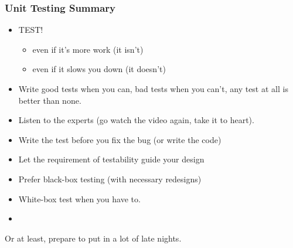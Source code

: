 \begin{frame}[fragile,t]
\frametitle{Unit Testing Summary}

\begin{itemize}
\item TEST!
\begin{itemize}
  \item even if it's more work (it isn't)
  \item even if it slows you down (it doesn't)
\end{itemize}
\pause{}
\item Write good tests when you can, bad tests when you can't, any
  test at all is better than none.
\pause{}
\item Listen to the experts (go watch the video again, take it to heart).
\pause{}
\item Write the test before you fix the bug (or write the code)
\pause{}
\item Let the requirement of testability guide your design
\item Prefer black-box testing (with necessary redesigns)
\item White-box test when you have to.
\item 
\end{itemize}
\vskip 12pt

\begin{center}
\end{center}


\begin{center}

\pause{}

Or at least, prepare to put in a lot of late nights.
\end{center}

\end{frame}







